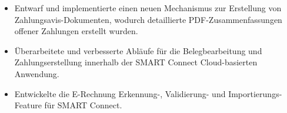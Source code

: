 \begin{minipage}{\linewidth}
\begin{itemize}
  \item Entwarf und implementierte einen neuen Mechanismus zur Erstellung von Zahlungsavis-Dokumenten, wodurch detaillierte PDF-Zusammenfassungen offener Zahlungen erstellt wurden.
  \item Überarbeitete und verbesserte Abläufe für die Belegbearbeitung und Zahlungserstellung innerhalb der SMART Connect Cloud-basierten Anwendung.
  \item Entwickelte die E-Rechnung Erkennung-, Validierung- und Importierungs-Feature für SMART Connect.
\end{itemize}
\end{minipage}
\divider
